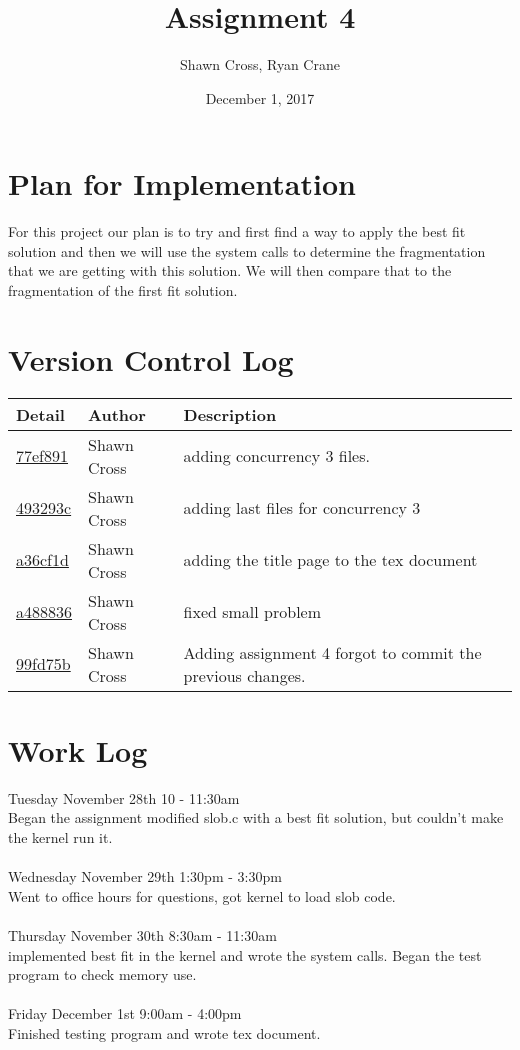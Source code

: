 \documentclass[letterpaper,10pt,titlepage]{article}
\begin{document}
\title{Assignment 4}
\date{December 1, 2017}
\author{Shawn Cross, Ryan Crane}
\maketitle

\section{Plan for Implementation}

For this project our plan is to try and first find a way to apply the 
best fit solution and then we will use the system calls to determine the 
fragmentation that we are getting with this solution. We will then compare 
that to the fragmentation of the first fit solution. 

\section{Version Control Log}
\begin{tabular}{l l l}\textbf{Detail} & \textbf{Author} & \textbf{Description}\\\hline
\href{https://github.com/crosssh/CS444/commit/77ef8915c0518852fc5179cfdcd9d13c765f43b0}{77ef891} & Shawn Cross & adding concurrency 3 files.\\\hline
\href{https://github.com/crosssh/CS444/commit/493293c4ed6f02fa0ae80b534699703d705665b9}{493293c} & Shawn Cross & adding last files for concurrency 3\\\hline
\href{https://github.com/crosssh/CS444/commit/a36cf1d987dc262bd9055c419b370a4d2b430c38}{a36cf1d} & Shawn Cross & adding the title page to the tex document\\\hline
\href{https://github.com/crosssh/CS444/commit/a488836077a629fcc0e9ef43ac11cec51df94038}{a488836} & Shawn Cross & fixed small problem\\\hline
\href{https://github.com/crosssh/CS444/commit/99fd75bdfb7c68d9498469a85f246ba4db9aa885}{99fd75b} & Shawn Cross & Adding assignment 4 forgot to commit the previous changes.\\\hline\end{tabular}

\section{Work Log}
Tuesday November 28th 10 - 11:30am\\ 
Began the assignment modified slob.c with a best fit solution,
but couldn't make the kernel run it.\\\\
Wednesday November 29th 1:30pm - 3:30pm\\
Went to office hours for questions, got kernel to load slob code.\\\\
Thursday November 30th 8:30am - 11:30am\\
implemented best fit in the kernel and wrote the system calls.
Began the test program to check memory use.\\\\
Friday December 1st 9:00am - 4:00pm\\
Finished testing program and wrote tex document.
\end{document}

